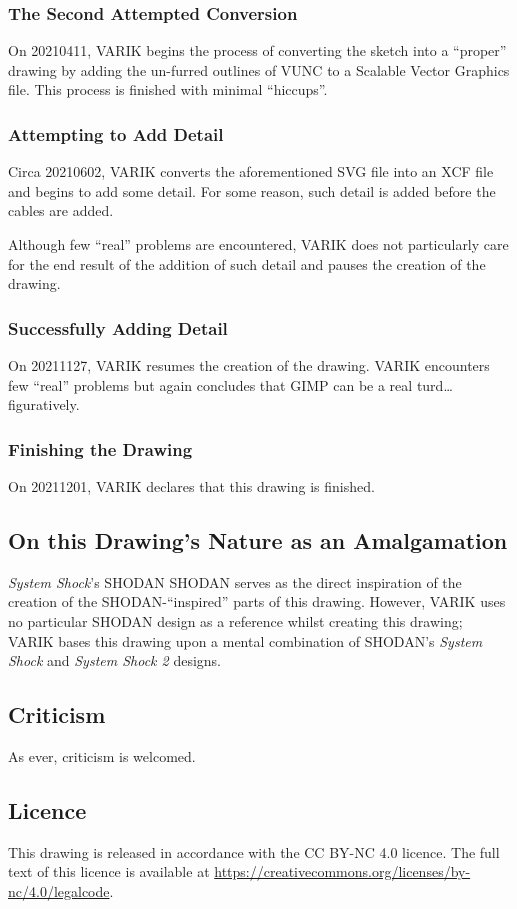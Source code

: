 \documentclass{report}
\begin{document}
\subsubsection{The Second Attempted Conversion}
On 20210411, VARIK begins the process of converting the sketch into a ``proper'' drawing by adding the un-furred outlines of VUNC to a Scalable Vector Graphics file.  This process is finished with minimal ``hiccups''.
\subsubsection{Attempting to Add Detail}
Circa 20210602, VARIK converts the aforementioned SVG file into an XCF file and begins to add some detail.  For some reason, such detail is added before the cables are added.

Although few ``real'' problems are encountered, VARIK does not particularly care for the end result of the addition of such detail and pauses the creation of the drawing.
\subsubsection{Successfully Adding Detail}
On 20211127, VARIK resumes the creation of the drawing.  VARIK encounters few ``real'' problems but again concludes that GIMP can be a real turd\ldots figuratively.
\subsubsection{Finishing the Drawing}
On 20211201, VARIK declares that this drawing is finished.
\subsection{On this Drawing's Nature as an Amalgamation}
\textit{System Shock}'s SHODAN SHODAN serves as the direct inspiration of the creation of the SHODAN-``inspired'' parts of this drawing.  However, VARIK uses no particular SHODAN design as a reference whilst creating this drawing; VARIK bases this drawing upon a mental combination of SHODAN's \textit{System Shock} and \textit{System Shock 2} designs.
\subsection{Criticism}
As ever, criticism is welcomed.
\subsection{Licence}
This drawing is released in accordance with the CC BY-NC 4.0 licence.  The full text of this licence is available at \url{https://creativecommons.org/licenses/by-nc/4.0/legalcode}.
\end{document}
